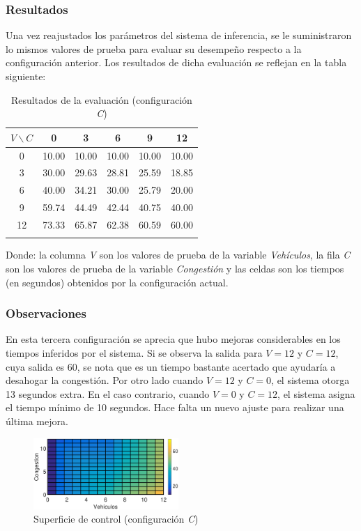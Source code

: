 \pagebreak
\subsubsection{Resultados}
Una vez reajustados los parámetros del sistema de inferencia, se le suministraron lo mismos valores de prueba para evaluar su desempeño respecto a la configuración anterior. Los resultados de dicha evaluación se reflejan en la tabla siguiente:\\

\begin{longtable}[c]{cccccc} \toprule
	$V \backslash C$ &  0 & 3 & 6 & 9 & 12 \\ \midrule
	0 & 10.00 & 10.00 & 10.00 & 10.00 & 10.00 \\
	3 & 30.00 & 29.63 & 28.81 & 25.59 & 18.85 \\
	6 & 40.00 & 34.21 & 30.00 & 25.79 & 20.00 \\
	9 & 59.74 & 44.49 & 42.44 & 40.75 & 40.00 \\
	12& 73.33 & 65.87 & 62.38 & 60.59 & 60.00 \\
	\caption{Resultados de la evaluación (configuración \textit{C})}
\end{longtable}

Donde: la columna \textit{V} son los valores de prueba de la variable \textit{Vehículos}, la fila \textit{C} son los valores de  prueba de la variable \textit{Congestión} y las celdas son los tiempos (en segundos) obtenidos por la configuración actual.\\

\subsubsection{Observaciones}
\begin{multicols}{2}

	En esta tercera configuración se aprecia que hubo mejoras considerables en los tiempos inferidos por el sistema. Si se observa la salida para $V = 12$ y $C = 12$, cuya salida es $60$, se nota que es un tiempo bastante acertado que ayudaría a desahogar la congestión. Por otro lado cuando $V = 12$ y $C = 0$, el sistema otorga 13 segundos extra. En el caso contrario, cuando $V = 0$ y $C = 12$, el sistema asigna el tiempo mínimo de 10 segundos. Hace falta un nuevo ajuste para realizar una última mejora.
	
	\begin{figure}[H]
		\includegraphics[width=0.49\textwidth]{Surfaces/Surface2D_C.eps}
		\caption{Superficie de control (configuración \textit{C})}
	\end{figure}
\end{multicols}
\pagebreak





